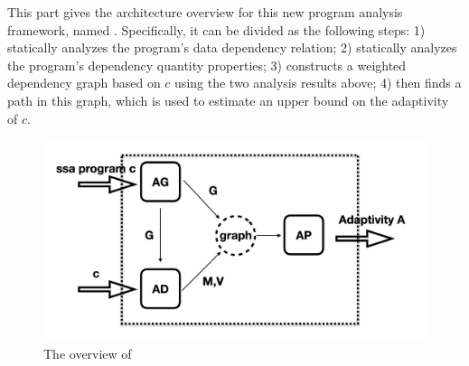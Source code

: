 This part gives the architecture overview for this 
new program analysis framework, named {\THESYSTEM}.
Specifically, it can be divided as the following steps:
1) statically analyzes the program's data dependency relation;
2) statically analyzes the program's dependency quantity properties;
3) constructs a weighted dependency graph based on $c$ using the two analysis results above; 
4) then finds a path in this graph, which is used to estimate an upper bound on the adaptivity of $c$.
\begin{figure}
  \centering    
\includegraphics[width=1.0\columnwidth]{adapfun.png}
  \vspace{-0.3cm}
  \caption{The overview of {\THESYSTEM}}
  \label{fig:adaptfun}
  \vspace{-0.5cm}
\end{figure}

